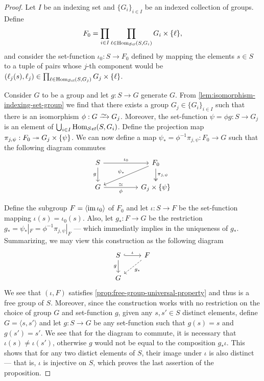 \begin{proof}
Let \(I\) be an indexing set and \(\{G_{i}\}_{i \in I}\) be an indexed
collection of groups. Define
\[
  F_0 = \prod_{i \in I} \prod_{\ell \in \operatorname{Hom}_{{\mathcal{S}\textit{et}}}(S, G_i)} G_i \times \{\ell\},
\]
and consider the set-function \(\iota_0: S \to F_0\) defined by mapping the elements
\(s \in S\) to a tuple of pairs whose \(j\)-th component would be \((\ell_j(s), \ell_j)
\in \prod_{\ell \in \operatorname{Hom}_{{\mathcal{S}\textit{et}}}(S, G_j)} G_j \times \{\ell\}\).

Consider \(G\) to be a group and let \(g: S \to G\) generate \(G\). From
\cref{lem:isomorphism-indexing-set-group} we find that there exists a group
\(G_j \in \{G_{i}\}_{i \in I}\) such that there is an isomorphism \(\phi: G \isoto
G_{j}\). Moreover, the set-function \(\psi = \phi g: S \to G_j\) is an element of \(\bigcup_{i
\in I} \operatorname{Hom}_{{\mathcal{S}\textit{et}}}(S, G_i)\). Define the projection map \(\pi_{j, \psi}: F_0 \twoheadrightarrow G_j \times
\{\psi\}\). We can now define a map \(\psi_{*} = \phi^{-1} \pi_{j, \psi}: F_0 \to G\) such that
the following diagram commutes
\[
  \begin{tikzcd}
    S \ar[rr, "\iota_0"] \ar[d, swap, "g"]  & &F_0 \ar[d, two heads, "\pi_{j, \psi}"]
    \ar[dll, swap, "\psi_{*}"] \\
    G \ar[rr, swap, "\phi", "\iso"'] & &G_j \times \{\psi\}
  \end{tikzcd}
\]

Define the subgroup \(F = \left\langle \operatorname{im} \iota_{0} \right\rangle\) of \(F_0\) and let \(\iota: S \to
F\) be the set-function mapping \(\iota(s) = \iota_0(s)\). Also, let \(g_{*}: F \to G\) be
the restriction \(g_{*} = \psi_{*}|_{F} = \phi^{-1} \pi_{j, \psi}|_{F}\) --- which immediatly
implies in the uniqueness of \(g_{*}\). Summarizing, we may view this
construction as the following diagram
\[
  \begin{tikzcd}
    S \ar[r, hook, "\iota"] \ar[d, swap, "g"] &F \ar[dl, dashed, "g_{*}"] \\
    G &
  \end{tikzcd}
\]
We see that \((\iota, F)\) satisfies \cref{prop:free-group-universal-property} and
thus is a free group of \(S\). Moreover, since the construction works with no
restriction on the choice of group \(G\) and set-function \(g\), given any \(s,
s' \in S\) distinct elements, define \(G = \langle s, s' \rangle\) and let \(g: S \to G\) be any
set-function such that \(g(s) = s\) and \(g(s') = s'\). We see that for the
diagram to commute, it is necessary that \(\iota(s) \neq \iota(s')\), otherwise \(g\) would
not be equal to the composition \(g_{*} \iota\). This shows that for any two
distict elements of \(S\), their image under \(\iota\) is also distinct --- that is,
\(\iota\) is injective on \(S\), which proves the last assertion of the proposition.
\end{proof}

